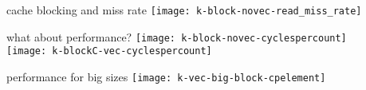 
\begin{frame}{cache blocking and miss rate}
\texttt{[image: k-block-novec-read\_miss\_rate]}
\end{frame}

\begin{frame}{what about performance?}
\vspace{-.5cm}
\texttt{[image: k-block-novec-cyclespercount]} \\
\texttt{[image: k-blockC-vec-cyclespercount]}
\end{frame}

\begin{frame}{performance for big sizes}
\texttt{[image: k-vec-big-block-cpelement]}
\end{frame}
